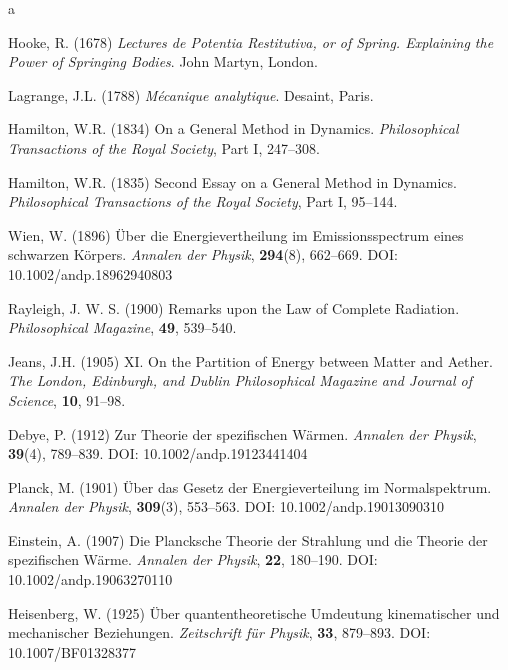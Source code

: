 \documentclass[11pt,a4paper,spanish]{book}
\begin{document}
	\begin{thebibliography}{a}
		
		
		 Hooke, R. (1678) \emph{Lectures de Potentia Restitutiva, or of Spring. Explaining the Power of Springing Bodies}. John Martyn, London.
		
		 Lagrange, J.L. (1788) \emph{Mécanique analytique}. Desaint, Paris.
		
		 Hamilton, W.R. (1834) On a General Method in Dynamics. \textit{Philosophical Transactions of the Royal Society}, Part I, 247--308.
		
		 Hamilton, W.R. (1835) Second Essay on a General Method in Dynamics. \textit{Philosophical Transactions of the Royal Society}, Part I, 95--144.
		
		 Wien, W. (1896) Über die Energievertheilung im Emissionsspectrum eines schwarzen Körpers. \textit{Annalen der Physik}, \textbf{294}(8), 662--669. DOI: 10.1002/andp.18962940803
		
		 Rayleigh, J. W. S. (1900) Remarks upon the Law of Complete Radiation. \textit{Philosophical Magazine}, \textbf{49}, 539--540.
		
		 Jeans, J.H. (1905) XI. On the Partition of Energy between Matter and Aether. \textit{The London, Edinburgh, and Dublin Philosophical Magazine and Journal of Science}, \textbf{10}, 91--98.
		
		 Debye, P. (1912) Zur Theorie der spezifischen Wärmen. \textit{Annalen der Physik}, \textbf{39}(4), 789--839. DOI: 10.1002/andp.19123441404
		
		
		
		 Planck, M. (1901) Über das Gesetz der Energieverteilung im Normalspektrum. \textit{Annalen der Physik}, \textbf{309}(3), 553--563. DOI: 10.1002/andp.19013090310
		
		 Einstein, A. (1907) Die Plancksche Theorie der Strahlung und die Theorie der spezifischen Wärme. \textit{Annalen der Physik}, \textbf{22}, 180--190. DOI: 10.1002/andp.19063270110
		
		 Heisenberg, W. (1925) Über quantentheoretische Umdeutung kinematischer und mechanischer Beziehungen. \textit{Zeitschrift für Physik}, \textbf{33}, 879--893. DOI: 10.1007/BF01328377
		

\end{thebibliography}
\end{document}
